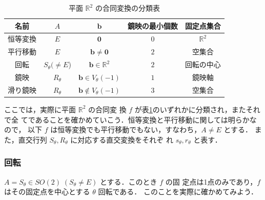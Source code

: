 \documentclass[11pt, uplatex, dvipdfmx, titlepage]{jsarticle}
\theoremstyle{definition}
\begin{document}
\begin{table}[h]
  \centering
  \begin{tabular}[h]{|c|c|c|c|c|}\hline
    名前 & $A$ & $\bm{b}$ & 鏡映の最小個数 & 固定点集合\\ \hline
    恒等変換 & $E$ & $\bm{0}$ & $0$ & $\mathbb{R}^2$ \\
    平行移動 & $E$ & $\bm{b} \neq \bm{0}$ & $2$ & 空集合\\
    回転 & $S_{\theta} (\neq E$) & $\bm{b} \in \mathbb{R}^2$ & $2$ & 回転の中心\\
    鏡映 & $R_{\theta}$ & $\bm{b} \in V_{\theta}(-1)$ & $1$ & 鏡映軸  \\
    滑り鏡映 & $R_{\theta}$ & $\bm{b} \notin V_{\theta}(-1)$ & $3$ & 空集合\\ \hline
  \end{tabular}
  \caption{平面 $\mathbb{R}^2$ の合同変換の分類表}
  \label{tab:classification2}
\end{table}


ここでは，実際に平面 $\mathbb{R}^2$ の合同変
換 $f$ が表\ref{tab:classification2}のいずれかに分類され，またそれで全
てであることを確かめていこう．恒等変換と平行移動に関しては明らかなので，
以下 $f$ は恒等変換でも平行移動でもない，すなわち，$A \neq E$ とする．
また，直交行列 $S_{\theta}, R_{\theta}$ に対応する直交変換をそれぞ
れ $s_{\theta}, r_{\theta}$ と表す．

\subsubsection{回転}\label{sec:rotation2}

$A = S_{\theta} \in SO(2) \; (S_{\theta} \neq E)$ とする．このとき $f$ の固
定点は1点のみであり，$f$ はその固定点を中心とする $\theta$ 回転である．
このことを実際に確かめてみよう．
\end{document}
